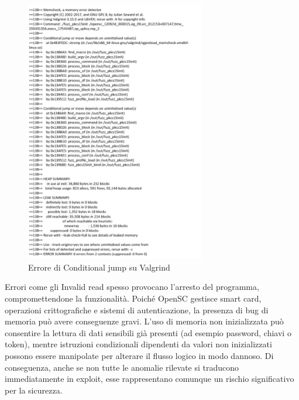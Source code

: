 \begin{figure}[htbp]        
  \centering               
  \includegraphics[width=0.7\textwidth]{immagini/valgrind-error.jpg}  
  \caption{Errore di Conditional jump su Valgrind}  
  \label{fig:valgrind-error}      
\end{figure}

Errori come gli Invalid read spesso provocano l’arresto del programma, compromettendone la funzionalità. Poiché OpenSC gestisce smart card, operazioni crittografiche e sistemi di autenticazione, la presenza di bug di memoria può avere conseguenze gravi. L’uso di memoria non inizializzata può consentire la lettura di dati sensibili già presenti (ad esempio password, chiavi o token), mentre istruzioni condizionali dipendenti da valori non inizializzati possono essere manipolate per alterare il flusso logico in modo dannoso. Di conseguenza, anche se non tutte le anomalie rilevate si traducono immediatamente in exploit, esse rappresentano comunque un rischio significativo per la sicurezza.